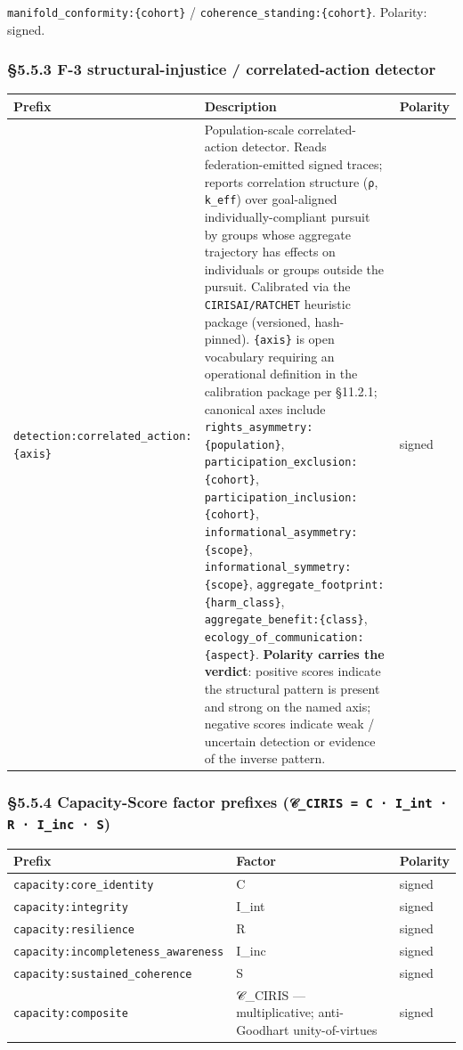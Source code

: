 \documentclass[10pt]{article}
\begin{document}
\texttt{manifold\_conformity:\{cohort\}} / \texttt{coherence\_standing:\{cohort\}}. Polarity: signed.


\subsubsection*{§5.5.3 F-3 structural-injustice / correlated-action detector}


{\footnotesize
\begin{longtable}{|p{5.33cm}|p{5.33cm}|p{5.33cm}|}\hline
\textbf{Prefix} & \textbf{Description} & \textbf{Polarity} \\ \hline\endhead
\texttt{detection:correlated\_action:\{axis\}} & Population-scale correlated-action detector. Reads federation-emitted signed traces; reports correlation structure (\texttt{ρ}, \texttt{k\_eff}) over goal-aligned individually-compliant pursuit by groups whose aggregate trajectory has effects on individuals or groups outside the pursuit. Calibrated via the \texttt{CIRISAI/RATCHET} heuristic package (versioned, hash-pinned). \texttt{\{axis\}} is open vocabulary requiring an operational definition in the calibration package per §11.2.1; canonical axes include \texttt{rights\_asymmetry:\{population\}}, \texttt{participation\_exclusion:\{cohort\}}, \texttt{participation\_inclusion:\{cohort\}}, \texttt{informational\_asymmetry:\{scope\}}, \texttt{informational\_symmetry:\{scope\}}, \texttt{aggregate\_footprint:\{harm\_class\}}, \texttt{aggregate\_benefit:\{class\}}, \texttt{ecology\_of\_communication:\{aspect\}}. \textbf{Polarity carries the verdict}: positive scores indicate the structural pattern is present and strong on the named axis; negative scores indicate weak / uncertain detection or evidence of the inverse pattern. & signed \\ \hline
\end{longtable}}


\subsubsection*{§5.5.4 Capacity-Score factor prefixes (\texttt{𝒞\_CIRIS = C · I\_int · R · I\_inc · S})}


{\footnotesize
\begin{longtable}{|p{5.33cm}|p{5.33cm}|p{5.33cm}|}\hline
\textbf{Prefix} & \textbf{Factor} & \textbf{Polarity} \\ \hline\endhead
\texttt{capacity:core\_identity} & C & signed \\ \hline
\texttt{capacity:integrity} & I\_int & signed \\ \hline
\texttt{capacity:resilience} & R & signed \\ \hline
\texttt{capacity:incompleteness\_awareness} & I\_inc & signed \\ \hline
\texttt{capacity:sustained\_coherence} & S & signed \\ \hline
\texttt{capacity:composite} & 𝒞\_CIRIS — multiplicative; anti-Goodhart unity-of-virtues & signed \\ \hline
\end{longtable}}
\end{document}
